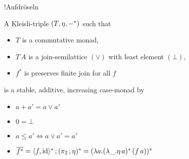 \documentclass[runningheads,envcountsame]{llncs}
\begin{document}
!Aufdröseln
\begin{lemma} \label{lem:case-semilattice}
    A Kleisli-triple $(T, \munit, -^*)$ such that 
    \begin{itemize}
        \item $T$ is a commutative monad,
        \item $T\,A$ is a join-semilattice $(\vee)$ with least element $(\bot)$,
        \item $f^*$ is preserves finite join for all $f$
    \end{itemize}
    is a stable, additive, increasing case-monad by
    \begin{itemize}
        \item $a + a' = a \vee a'$
        \item $0 = \bot$
        \item $a \leq a' \iff a \vee a' = a'$
        \item $\overline{f^*} = \comp{\langle f, \id \rangle^*}{(\comp{\pi_2}{\munit})^*} = (\lambda a. (\lambda \_. \munit\,a)^*\,(f\,a))^*$
    \end{itemize}
\end{lemma}
\end{document}
